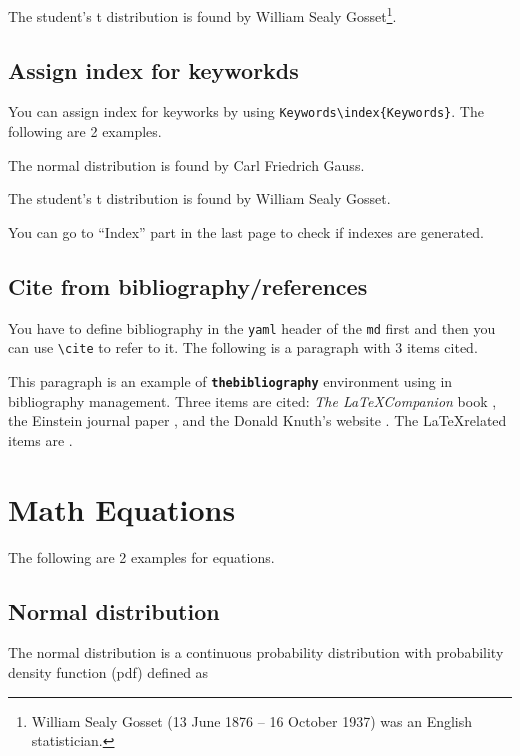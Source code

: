 \documentclass[10pt, a4paper, oneside]{article}
\begin{document}
The student's t distribution is found by William Sealy Gosset\footnote{William Sealy Gosset (13 June 1876 -- 16 October 1937) was an English statistician.}.

\subsection{Assign index for keyworkds}\label{assign-index-for-keyworkds}

You can assign index for keyworks by using \texttt{Keywords\textbackslash{}index\{Keywords\}}.
The following are 2 examples.

The normal distribution is found by Carl Friedrich Gauss.

The student's t distribution is found by William Sealy Gosset.

You can go to ``Index'' part in the last page to check if indexes are generated.

\subsection{Cite from bibliography/references}\label{cite-from-bibliographyreferences}

You have to define bibliography in the \texttt{yaml} header of the \texttt{md} first and then you can use \texttt{\textbackslash{}cite} to refer to it.
The following is a paragraph with 3 items cited.

This paragraph is an example of \textbf{\texttt{thebibliography}} environment using
in bibliography management. Three items are cited: \emph{The \LaTeX Companion}
book \cite{latexcompanion}, the Einstein journal paper \cite{einstein}, and the
Donald Knuth's website \cite{knuthwebsite}. The \LaTeX related items are
\cite{latexcompanion,knuthwebsite}.

\clearpage

\section{Math Equations}\label{math-equations}

The following are 2 examples for equations.

\subsection{Normal distribution}\label{normal-distribution}

The normal distribution is a continuous probability distribution with probability density function (pdf) defined as
\end{document}
